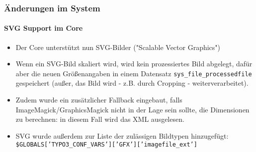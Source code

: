 %
\begin{frame}[fragile]
	\frametitle{Änderungen im System}
	\framesubtitle{SVG Support im Core}

	\begin{itemize}
		\item Der Core unterstützt nun SVG-Bilder ("Scalable Vector Graphics")

		\item Wenn ein SVG-Bild skaliert wird, wird kein prozessiertes Bild abgelegt,
			dafür aber die neuen Größenangaben in einem Datensatz \texttt{sys\_file\_processedfile}
			gespeichert\newline
			\small(außer, das Bild wird - z.B. durch Cropping - weiterverarbeitet)\normalsize.

		\item Zudem wurde ein zusätzlicher Fallback eingebaut, falls ImageMagick/GraphicsMagick nicht
			in der Lage sein sollte, die Dimensionen zu berechnen: in diesem Fall wird das XML ausgelesen.

		\item SVG wurde außerdem zur Liste der zulässigen Bildtypen hinzugefügt:\newline
			\texttt{\$GLOBALS['TYPO3\_CONF\_VARS']['GFX']['imagefile\_ext']}

	\end{itemize}

\end{frame}


